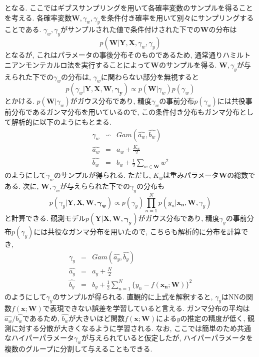 \documentclass[twocolumn]{jarticle}
\begin{document}
となる. ここではギブスサンプリングを用いて各確率変数のサンプルを得ることを考える. 各確率変数${\bm {W}, \gamma_w, \gamma_y}$を条件付き確率を用いて別々にサンプリングすることである. ${\gamma_w, \gamma_y}$がサンプルされた値で条件付けされた下での${\bm {W}}$の分布は
\begin{equation}
  p(\bm {W|Y, X}, \gamma_w, \gamma_y)
\end{equation}
となるが, これはパラメータの事後分布そのものであるため, 通常通りハミルトニアンモンテカルロ法を実行することによって${\bm {W}}$のサンプルを得る. ${\bm {W}, \gamma_y}$が与えられた下での${\gamma_w}$の分布は, ${\gamma_w}$に関わらない部分を無視すると
\begin{equation}
  p(\gamma_w| \bm {Y, X, W, \gamma_y}) \varpropto p(\bm {W}|\gamma_w)p(\gamma_w)
\end{equation}
とかける. ${p(\bm {W}|\gamma_w)}$がガウス分布であり, 精度${\gamma_w}$の事前分布${p(\gamma_w)}$には共役事前分布であるガンマ分布を用いているので, この条件付き分布もガンマ分布として解析的に以下のようにもとまる.
\begin{eqnarray}
  \gamma_w &\backsim & Gam (\hat{a_w}, \hat{b_w}) \\
  \hat{a_w} &=& a_w + \frac{K_w}{2} \\
  \hat{b_w} &=& b_w + \frac{1}{2} \sum_{w \in \bm {W}} w^2
\end{eqnarray}
のようにして${\gamma_w}$のサンプルが得られる. ただし, ${K_w}$は重みパラメータ${\bm {W}}$の総数である. 次に, ${\bm {W}, \gamma_w}$が与えらられた下での${\gamma_y}$の分布も
\begin{equation}
  p(\gamma_y|\bm {Y, X, W, \gamma_w}) \varpropto p(\gamma_y) \prod_{n=1}^{N} p(y_n|\bm {x_n, W}, \gamma_y)
\end{equation}
と計算できる. 観測モデル${p(\bm {Y|X, W, \gamma_y})}$がガウス分布であり, 精度${\gamma_y}$の事前分布${p(\gamma_y)}$には共役なガンマ分布を用いたので, こちらも解析的に分布を計算でき,
\begin{eqnarray}
  \gamma_y &=& Gam (\hat{a_y}, \hat{b_y}) \\
  \hat {a_y} &=& a_y + \frac{N}{2} \\
  \hat {b_y} &=& b_y + \frac{1}{2} \sum_{n=1}^{N} \{y_n - f(\bm {x_n;W})\}^2
\end{eqnarray}
のようにして${\gamma_y}$のサンプルが得られる. 直観的に上式を解釈すると, ${\gamma_y}$はNNの関数${f(\bm {x;W})}$で表現できない誤差を学習していると言える. ガンマ分布の平均は${\hat {a_w} / \hat {b_w}}$であるため, ${\hat {b_w}}$が大きいほど関数${f(\bm {x;W})}$による${y}$の推定の精度が低く, 観測に対する分散が大きくなるように学習される. なお, ここでは簡単のため共通なハイパーパラメータ${\gamma_w}$が与えられていると仮定したが, ハイパーパラメータを複数のグループに分割して与えることもできる.
\end{document}
